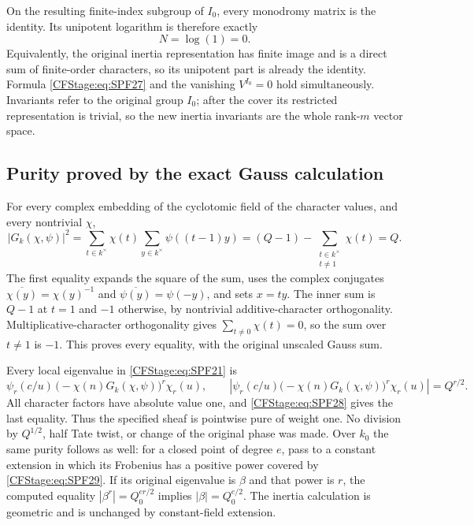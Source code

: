 On the resulting finite-index subgroup of \(I_0\), every
monodromy matrix is the identity. Its unipotent logarithm is
therefore exactly
\[
 N=\log(1)=0.
 \tag{SPF.27}\label{CFStage:eq:SPF27}
\]
Equivalently, the original inertia representation has finite
image and is a direct sum of finite-order characters, so its
unipotent part is already the identity. Formula
\eqref{CFStage:eq:SPF27} and the vanishing \(V^{I_0}=0\) hold
simultaneously. Invariants refer to the original group
\(I_0\); after the cover its restricted representation is
trivial, so the new inertia invariants are the whole
rank-\(m\) vector space.

\subsection{Purity proved by the exact Gauss calculation}

For every complex embedding of the cyclotomic field of the
character values, and every nontrivial \(\chi\),
\[
 |G_k(\chi,\psi)|^2
   =\sum_{t\in k^\times}\chi(t)
       \sum_{y\in k^\times}\psi((t-1)y)
   =(Q-1)-\sum_{\substack{t\in k^\times\\t\ne1}}\chi(t)
   =Q.
 \tag{SPF.28}\label{CFStage:eq:SPF28}
\]
The first equality expands the square of the sum, uses the
complex conjugates \(\overline{\chi(y)}=\chi(y)^{-1}\) and
\(\overline{\psi(y)}=\psi(-y)\), and sets \(x=ty\).
The inner sum is \(Q-1\) at \(t=1\) and \(-1\) otherwise,
by nontrivial additive-character orthogonality.
Multiplicative-character orthogonality gives
\(\sum_{t\ne0}\chi(t)=0\), so the sum over \(t\ne1\) is
\(-1\). This proves every equality, with the original
unscaled Gauss sum.

Every local eigenvalue in \eqref{CFStage:eq:SPF21} is
\[
 \psi_r(c/u)\,
       \bigl(-\chi(n)G_k(\chi,\psi)\bigr)^r\chi_r(u),
 \qquad
 \left|\psi_r(c/u)
       \bigl(-\chi(n)G_k(\chi,\psi)\bigr)^r\chi_r(u)\right|
       =Q^{r/2}.
 \tag{SPF.29}\label{CFStage:eq:SPF29}
\]
All character factors have absolute value one, and
\eqref{CFStage:eq:SPF28} gives the last equality. Thus the
specified sheaf is pointwise pure of weight one.
No division by \(Q^{1/2}\), half Tate twist, or change of
the original phase was made. Over \(k_0\) the same purity
follows as well: for a closed point of degree \(e\), pass
to a constant extension in which its Frobenius has a
positive power covered by \eqref{CFStage:eq:SPF29}. If its original
eigenvalue is \(\beta\) and that power is \(r\), the computed
equality \(|\beta^r|=Q_0^{er/2}\) implies
\(|\beta|=Q_0^{e/2}\). The inertia calculation is geometric
and is unchanged by constant-field extension.

